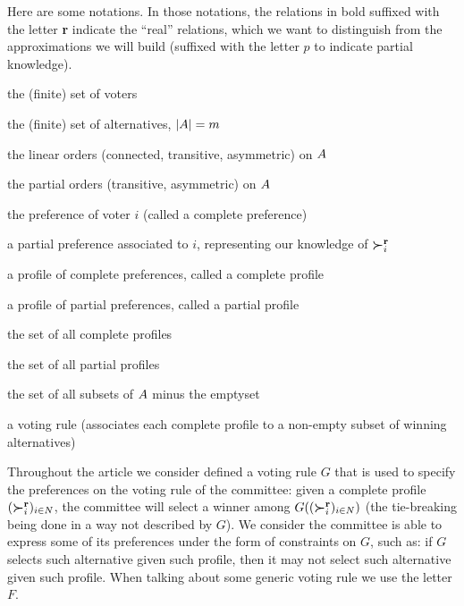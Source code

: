 \documentclass[version=last, pagesize, twoside=off, bibliography=totoc, DIV=calc, fontsize=14pt, a4paper, french, english]{scrartcl}
\begin{document}
Here are some notations. In those notations, the relations in bold suffixed with the letter \textbf{r} indicate the “real” relations, which we want to distinguish from the approximations we will build (suffixed with the letter $p$ to indicate partial knowledge).
\begin{description}[font=\normalfont, leftmargin=!, labelwidth=\widthof{$F: \allprofs \rightarrow \powersetz{\allalts}$}]
	\item[$N ≠ \emptyset$] the (finite) set of voters
	\item[$\allalts$] the (finite) set of alternatives, $\lvert{A}\rvert = m$
	\item[$\linors \subseteq \powerset{\allalts × \allalts}$] the linear orders (connected, transitive, asymmetric) on $\allalts$
	\item[$\pors \subseteq \powerset{\allalts × \allalts}$] the partial orders (transitive, asymmetric) on $\allalts$
	\item[$\pref_i \in \linors$] the preference of voter $i$ (called a complete preference)
	\item[$\ppref_i \in \pors$] a partial preference associated to $i$, representing our knowledge of $\boldsymbol{\succ}^\textbf{r}_i$
	\item[$\prof = \profshort$] a profile of complete preferences, called a complete profile
	\item[$\pprof = \pprofshort$] a profile of partial preferences, called a partial profile
	\item[$\allprofs$] the set of all complete profiles
	\item[$\allpprofs$] the set of all partial profiles
	\item[$\powersetz{\allalts}$] the set of all subsets of $\allalts$ minus the emptyset
	\item[$F: \allprofs \rightarrow \powersetz{\allalts}$] a voting rule (associates each complete profile to a non-empty subset of winning alternatives)
\end{description}

Throughout the article we consider defined a voting rule $G$ that is used to specify the preferences on the voting rule of the committee: given a complete profile $(\boldsymbol{\succ}^\textbf{r}_i)_{i \in N}$, the committee will select a winner among $G((\boldsymbol{\succ}^\textbf{r}_i)_{i \in N})$ (the tie-breaking being done in a way not described by $G$). We consider the committee is able to express some of its preferences under the form of constraints on $G$, such as: if $G$ selects such alternative given such profile, then it may not select such alternative given such profile.
When talking about some generic voting rule we use the letter $F$. 
\end{document}
